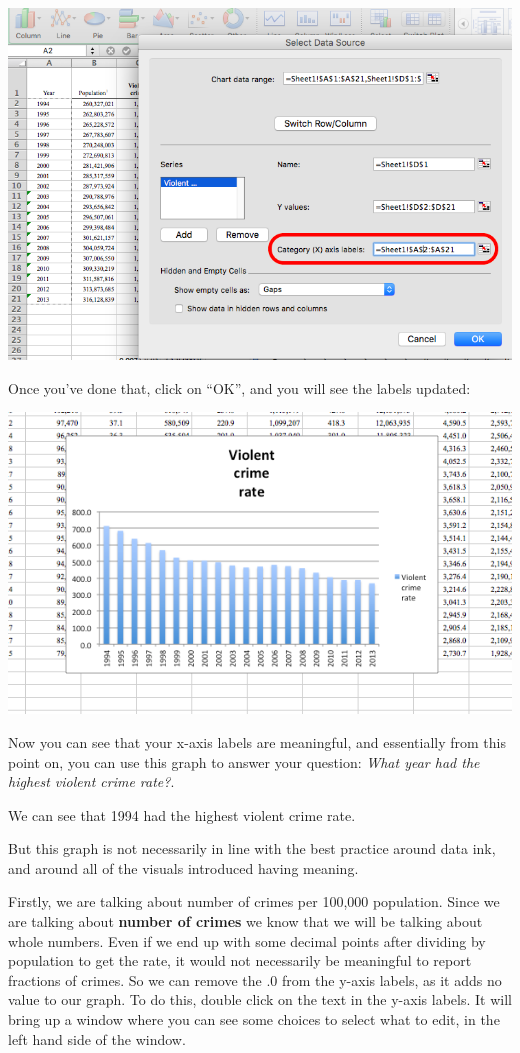 \documentclass[
]{book}
\begin{document}
\includegraphics{imgs/desc_viz_4.png}

Once you've done that, click on ``OK'', and you will see the labels updated:

\includegraphics{imgs/desc_viz_5.png}

Now you can see that your x-axis labels are meaningful, and essentially from this point on, you can use this graph to answer your question: \emph{What year had the highest violent crime rate?}.

We can see that 1994 had the highest violent crime rate.

But this graph is not necessarily in line with the best practice around data ink, and around all of the visuals introduced having meaning.

Firstly, we are talking about number of crimes per 100,000 population. Since we are talking about \textbf{number of crimes} we know that we will be talking about whole numbers. Even if we end up with some decimal points after dividing by population to get the rate, it would not necessarily be meaningful to report fractions of crimes. So we can remove the .0 from the y-axis labels, as it adds no value to our graph. To do this, double click on the text in the y-axis labels. It will bring up a window where you can see some choices to select what to edit, in the left hand side of the window.
\end{document}
